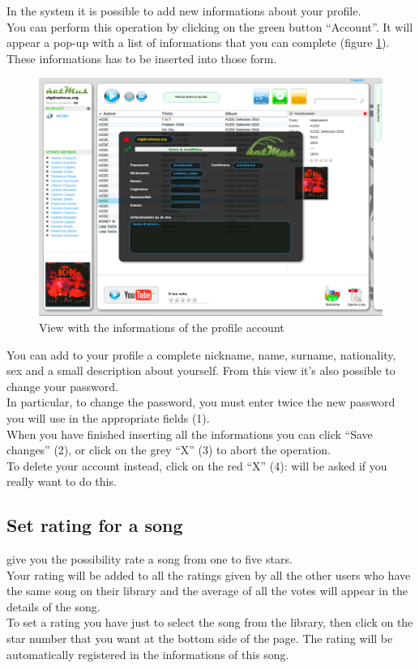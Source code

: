 In the  system it is possible to add new informations about your
profile.\\
You can perform this operation by clicking on the green button ``Account''. It
will appear a pop-up with a list of informations that you can complete (figure
\ref{fig:profilo}). These informations has to be inserted into those form.\\
\begin{figure}[!htbp]
  \centering
  \includegraphics[width=15cm]{img/MU/profile_view.png}
\caption{View with the informations of the profile account}
\label{fig:profilo}
\end{figure}

You can add to your profile a complete nickname, name, surname, nationality, sex
and a small description about yourself. From this view it's also possible to change
your password.\\

In particular, to change the password, you must enter twice the new
password you will use in the appropriate fields (1). \\

When you have finished inserting all the informations you can click ``Save
changes'' (2), or click on the grey ``X'' (3) to abort the operation.\\

To delete your account instead, click on the red ``X'' (4): will be asked if you
really want to do this.

\subsection{Set rating for a song}
\label{cap:voto}
 give you the possibility rate a song from one to five
stars.\\
Your rating will be added to all the ratings given by all the other users who
have the same song on their library and the average of all the votes will appear
in the details of the song.\\
To set a rating you have just to select the song from the library, then click on
the star number that you want at the bottom side of the page. The rating will be
automatically registered in the informations of this song.

